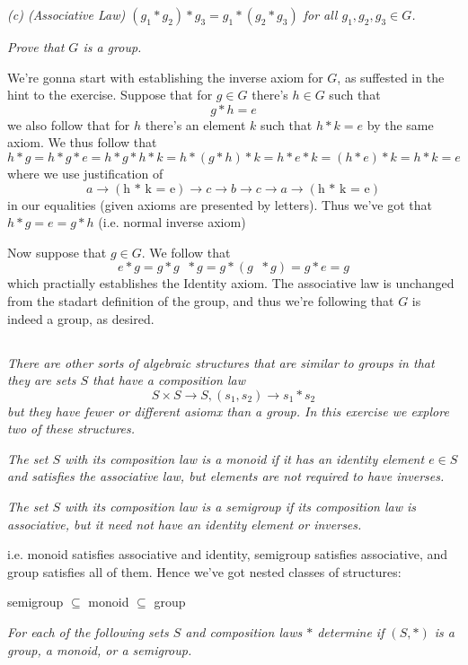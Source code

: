 \documentclass[11pt,oneside,titlepage]{book}
\DeclareMathOperator \inv {^{-1}}
\begin{document}
\textit{(c) (Associative Law) $(g_1 * g_2) * g_3 = g_1 * (g_2 * g_3)$
for all $g_1, g_2, g_3 \in G$.}

\textit{Prove that $G$ is a group.}

We're gonna start with establishing the inverse axiom for $G$,
as suffested in the hint to the exercise.
Suppose that for $g \in G$ there's $h \in G$ such that 
$$g * h = e$$
we also follow that for $h$ there's an element $k$ such that
$h * k = e$ by the same axiom. We thus follow that
$$ h * g = h * g * e = h * g * h * k = h * (g * h) * k = h * e * k = (h * e) * k = h * k = e $$
where we use justification of
$$a \to (\text{h * k = e}) \to c \to b \to c \to a \to (\text{h * k = e})$$
in our equalities (given axioms are presented by letters).
Thus we've got that $h * g = e = g * h$ (i.e. normal inverse axiom)

Now suppose that $g \in G$. We follow that
$$e * g = g * g\inv * g = g * (g\inv * g) =  g * e = g$$
which practially establishes the Identity axiom. The associative law
is unchanged from the stadart definition of the group, and thus we're
following that $G$ is indeed a group, as desired.

\subsection{}

\textit{There are other sorts of algebraic structures that are similar to groups in that
  they are sets $S$ that have a composition law}
$$S \times S \to S, (s_1, s_2) \to s_1 * s_2$$
\textit{but they have fewer or different asiomx than a group. In this exercise we explore two
  of these structures.}

\textit{The set $S$ with its composition law is a monoid if it has an
identity element $e \in S$ and satisfies the associative law, but
elements are not required to have inverses.}

\textit{The set $S$ with its composition law is a semigroup if its
composition law is associative, but it need not have an identity
element or inverses.}

i.e. monoid satisfies associative and identity, semigroup satisfies associative,
and group satisfies all of them. Hence we've got nested classes of structures:

semigroup $\subseteq$ monoid $\subseteq$ group

\textit{For each of the following sets $S$ and composition laws $*$
determine if $(S, *)$ is a group, a monoid, or a semigroup.}
\end{document}

